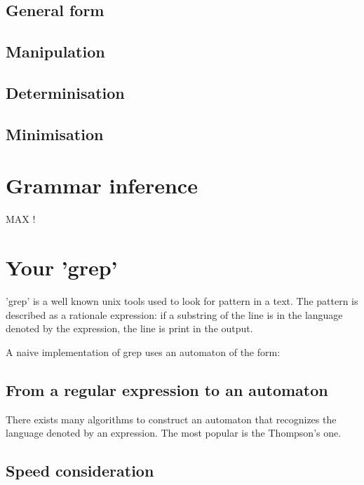 \documentclass{article}
\begin{document}
\begin{code}
\subsection{General form}

\subsection{Manipulation}

\subsection{Determinisation}

\subsection{Minimisation}

\section{Grammar inference}

MAX !

\section{Your 'grep'}

'grep' is a well known unix tools used to look for pattern in a text. The pattern is described as a rationale expression: if a substring of the line is in the language denoted by the expression, the line is print in the output.

A naive implementation of grep uses an automaton of the form:

\subsection{From a regular expression to an automaton}

There exists many algorithms to construct an automaton that recognizes the language denoted by an expression. The most popular is the Thompson's one.

\begin{code}

\end{code}

\subsection{Speed consideration}


\end{code}
\end{document}
